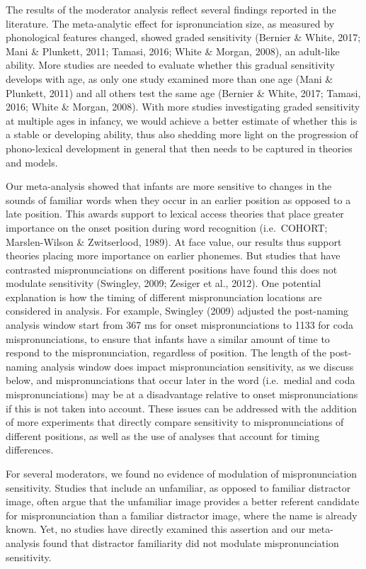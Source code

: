 \documentclass[man, noextraspace]{apa6}
\begin{document}
The results of the moderator analysis reflect several findings reported in the literature. The meta-analytic effect for ispronunciation size, as measured by phonological features changed, showed graded sensitivity (Bernier \& White, 2017; Mani \& Plunkett, 2011; Tamasi, 2016; White \& Morgan, 2008), an adult-like ability. More studies are needed to evaluate whether this gradual sensitivity develops with age, as only one study examined more than one age (Mani \& Plunkett, 2011) and all others test the same age (Bernier \& White, 2017; Tamasi, 2016; White \& Morgan, 2008). With more studies investigating graded sensitivity at multiple ages in infancy, we would achieve a better estimate of whether this is a stable or developing ability, thus also shedding more light on the progression of phono-lexical development in general that then needs to be captured in theories and models.

Our meta-analysis showed that infants are more sensitive to changes in the sounds of familiar words when they occur in an earlier position as opposed to a late position. This awards support to lexical access theories that place greater importance on the onset position during word recognition (i.e.~COHORT; Marslen-Wilson \& Zwitserlood, 1989). At face value, our results thus support theories placing more importance on earlier phonemes. But studies that have contrasted mispronunciations on different positions have found this does not modulate sensitivity (Swingley, 2009; Zesiger et al., 2012). One potential explanation is how the timing of different mispronunciation locations are considered in analysis. For example, Swingley (2009) adjusted the post-naming analysis window start from 367 ms for onset mispronunciations to 1133 for coda mispronunciations, to ensure that infants have a similar amount of time to respond to the mispronunciation, regardless of position. The length of the post-naming analysis window does impact mispronunciation sensitivity, as we discuss below, and mispronunciations that occur later in the word (i.e.~medial and coda mispronunciations) may be at a disadvantage relative to onset mispronunciations if this is not taken into account. These issues can be addressed with the addition of more experiments that directly compare sensitivity to mispronunciations of different positions, as well as the use of analyses that account for timing differences.

For several moderators, we found no evidence of modulation of mispronunciation sensitivity. Studies that include an unfamiliar, as opposed to familiar distractor image, often argue that the unfamiliar image provides a better referent candidate for mispronunciation than a familiar distractor image, where the name is already known. Yet, no studies have directly examined this assertion and our meta-analysis found that distractor familiarity did not modulate mispronunciation sensitivity.
\end{document}
